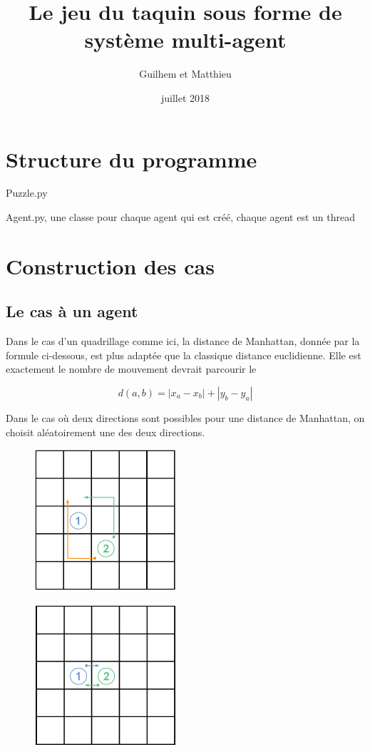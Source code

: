 \documentclass[a4paper, 12pt, french]{article}
\title{Le jeu du taquin sous forme de système multi-agent}
\author{Guilhem \bsc{Marion} et Matthieu \bsc{Vieira}}
\date{juillet 2018}
\begin{document}
\maketitle

\section{Structure du programme}

Puzzle.py 

Agent.py, une classe pour chaque agent qui est créé, chaque agent est un thread

\section{Construction des cas}

\subsection{Le cas à un agent}

Dans le cas d'un quadrillage comme ici, la distance de Manhattan, donnée par la formule ci-dessous, est plus adaptée que la classique distance euclidienne. Elle est exactement le nombre de mouvement devrait parcourir le

\[
d(a, b) = |x_a - x_b| + |y_b - y_a|
\]

Dans le cas où deux directions sont possibles pour une distance de Manhattan, on choisit aléatoirement une des deux directions.

\begin{figure}[h]
	\centering
	\includegraphics[width=200px]{images/manhattan_equal.png}
\end{figure}

\begin{figure}[h]
	\centering
	\includegraphics[width=200px]{images/switch.png}
\end{figure}
\end{document}
